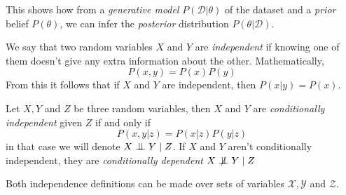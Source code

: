 This shows how from a \emph{generative model} \(P(\mathcal{D}|\theta)\) of the dataset
and a \emph{prior} belief \(P(\theta)\), we can infer the \emph{posterior} distribution
\(P(\theta|\mathcal{D})\). \\

\begin{definition}
We say that two random variables \(X\) and \(Y\) are \emph{independent} if knowing one of them doesn't give any extra information about the other. Mathematically,
\[
P(x,y) = P(x)P(y)
\]
From this it follows that if \(X\) and \(Y\) are independent, then \(P(x|y) = P(x)\).
\end{definition}


\begin{definition}
Let \(X,Y\) and \(Z\) be three random variables, then \(X\) and \(Y\) are
\emph{conditionally independent} given \(Z\) if and only if
\[
P(x,y | z) = P(x|z)P(y|z)
\]
in that case we will denote \(X \bigCI Y \mid Z\). If \(X\) and \(Y\) aren't
conditionally independent, they are \emph{conditionally dependent} \(X \bigCD Y \mid Z\)

\end{definition}

Both independence definitions can be made over sets of variables \(\mathcal{X},
\mathcal{Y}\) and \(\mathcal{Z}\).
